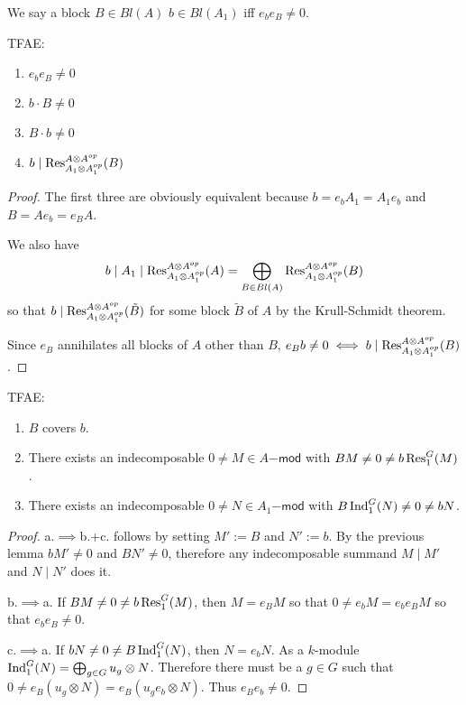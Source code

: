 
\begin{definition}
We say a block $B\in Bl(A)$  $b\in Bl(A_1)$ iff $e_b e_B \neq 0$.
\end{definition}

\begin{lemma}\label{covering_of_blocks:bimodules}
TFAE:
\begin{enumerate}
\item $e_b e_B \neq 0$
\item $b\cdot B\neq 0$
\item $B\cdot b\neq 0$
\item $b \mid \operatorname{Res}_{A_1\otimes A_1^{op}}^{A\otimes A^{op}}(B)$
\end{enumerate}
\end{lemma}
\begin{proof}
The first three are obviously equivalent because $b = e_b A_1=A_1 e_b$ and $B=Ae_b=e_BA$.

We also have
\[b \mid A_1 \mid \operatorname{Res}_{A_1\otimes A_1^{op}}^{A\otimes A^{op}}(A) = \bigoplus_{B\in Bl(A)} \operatorname{Res}_{A_1\otimes A_1^{op}}^{A\otimes A^{op}}(B)\]
so that $b \mid \operatorname{Res}_{A_1\otimes A_1^{op}}^{A\otimes A^{op}}(\tilde{B})$ for some block $\tilde{B}$ of $A$ by the Krull-Schmidt theorem.

Since $e_B$ annihilates all blocks of $A$ other than $B$, $e_B b \neq 0 \iff b \mid \operatorname{Res}_{A_1\otimes A_1^{op}}^{A\otimes A^{op}}(B)$.
\end{proof}

\begin{lemma}\label{covering_of_blocks:induction_restriction}
TFAE:
\begin{enumerate}
\item $B$ covers $b$.
\item There exists an indecomposable $0\neq M\in A\mathsf{-mod}$ with $B M\neq 0 \neq b \operatorname{Res}_1^G(M)$.
\item There exists an indecomposable $0\neq N\in A_1\mathsf{-mod}$ with $B \operatorname{Ind}_1^G(N) \neq 0 \neq b N$.
\end{enumerate}
\end{lemma}
\begin{proof}
a.$\implies$b.+c. follows by setting $M':=B$ and $N':=b$. By the previous lemma $bM' \neq 0$ and $BN'\neq 0$, therefore any indecomposable summand $M \mid M'$ and $N \mid N'$ does it.

\medbreak
b.$\implies$a. If $BM\neq 0 \neq b\operatorname{Res}_1^G(M)$, then $M=e_B M$ so that $0\neq e_b M=e_b e_B M$ so that $e_b e_B\neq 0$.

\medbreak
c.$\implies$a. If $bN\neq 0 \neq B\operatorname{Ind}_1^G(N)$, then $N=e_b N$. As a $k$-module $\operatorname{Ind}_1^G(N) = \bigoplus_{g\in G} u_g \otimes N$. Therefore there must be a $g\in G$ such that $0\neq e_B (u_g \otimes N) = e_B(u_g e_b \otimes N)$. Thus $e_B e_b \neq 0$.
\end{proof}

